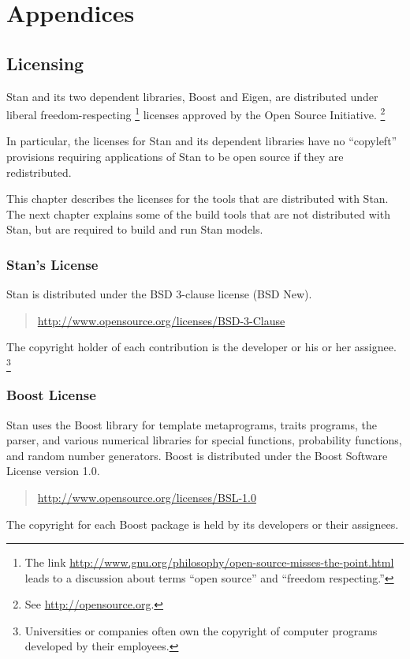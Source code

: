 \part*{Appendices}


\chapter{Licensing}\label{licensing.appendix}

\noindent
Stan and its two dependent libraries, Boost and Eigen, are
distributed under liberal freedom-respecting%
%
\footnote{The link
  \url{http://www.gnu.org/philosophy/open-source-misses-the-point.html}
  leads to a discussion about terms ``open
  source'' and ``freedom respecting.''}
%
licenses approved by the Open Source Initiative.%
\footnote{See \url{http://opensource.org}.}

In particular, the licenses for Stan and its dependent libraries have
no ``copyleft'' provisions requiring applications of Stan to be
open source if they are redistributed.

This chapter describes the licenses for the tools that are distributed
with Stan.  The next chapter explains some of the build tools that
are not distributed with Stan, but are required to build and run
Stan models.

\section{Stan's License}

Stan is distributed under the BSD 3-clause license (BSD New).
%
\begin{quote}
\url{http://www.opensource.org/licenses/BSD-3-Clause}
\end{quote}
%
The copyright holder of each contribution is the developer or his or
her assignee.%
%
\footnote{Universities or companies often own the copyright of
  computer programs developed by their employees.}


\section{Boost License}

Stan uses the Boost library for template metaprograms, traits
programs, the parser, and various numerical libraries for special
functions, probability functions, and random number generators.  Boost
is distributed under the Boost Software License version 1.0.
%
\begin{quote}
\url{http://www.opensource.org/licenses/BSL-1.0}
\end{quote}
%
The copyright for each Boost package is held by its developers or their
assignees.


